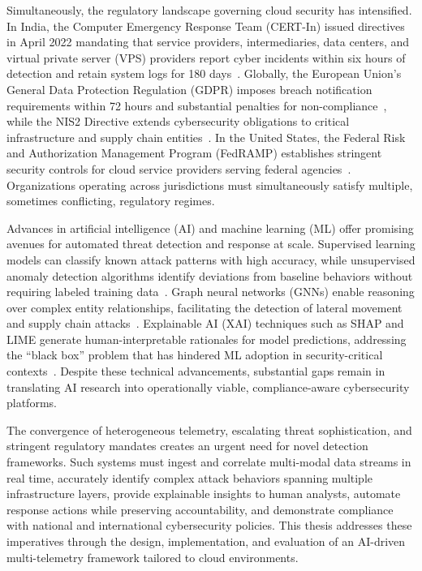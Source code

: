 Simultaneously, the regulatory landscape governing cloud security has intensified. In India, the Computer Emergency Response Team (CERT-In) issued directives in April 2022 mandating that service providers, intermediaries, data centers, and virtual private server (VPS) providers report cyber incidents within six hours of detection and retain system logs for 180 days~\cite{certin2022directive}. Globally, the European Union's General Data Protection Regulation (GDPR) imposes breach notification requirements within 72 hours and substantial penalties for non-compliance~\cite{gdpr2016}, while the NIS2 Directive extends cybersecurity obligations to critical infrastructure and supply chain entities~\cite{nis22022}. In the United States, the Federal Risk and Authorization Management Program (FedRAMP) establishes stringent security controls for cloud service providers serving federal agencies~\cite{fedramp2023}. Organizations operating across jurisdictions must simultaneously satisfy multiple, sometimes conflicting, regulatory regimes.

Advances in artificial intelligence (AI) and machine learning (ML) offer promising avenues for automated threat detection and response at scale. Supervised learning models can classify known attack patterns with high accuracy, while unsupervised anomaly detection algorithms identify deviations from baseline behaviors without requiring labeled training data~\cite{chandola2009anomaly}. Graph neural networks (GNNs) enable reasoning over complex entity relationships, facilitating the detection of lateral movement and supply chain attacks~\cite{wu2021gnnreview}. Explainable AI (XAI) techniques such as SHAP and LIME generate human-interpretable rationales for model predictions, addressing the ``black box'' problem that has hindered ML adoption in security-critical contexts~\cite{lundberg2017shap,ribeiro2016lime}. Despite these technical advancements, substantial gaps remain in translating AI research into operationally viable, compliance-aware cybersecurity platforms.

The convergence of heterogeneous telemetry, escalating threat sophistication, and stringent regulatory mandates creates an urgent need for novel detection frameworks. Such systems must ingest and correlate multi-modal data streams in real time, accurately identify complex attack behaviors spanning multiple infrastructure layers, provide explainable insights to human analysts, automate response actions while preserving accountability, and demonstrate compliance with national and international cybersecurity policies. This thesis addresses these imperatives through the design, implementation, and evaluation of an AI-driven multi-telemetry framework tailored to cloud environments.

